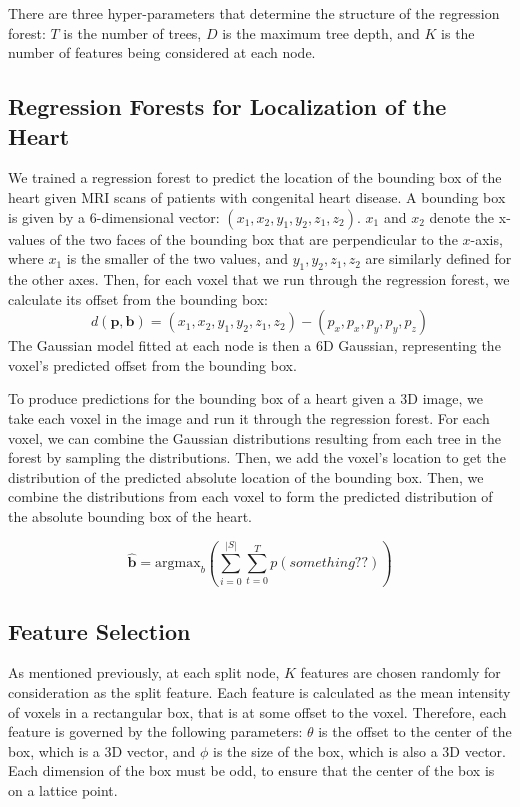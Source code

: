 There are three hyper-parameters that determine the structure of the regression forest: $T$ is the number of trees, $D$ is the maximum tree depth, and $K$ is the number of features being considered at each node.

\subsection{Regression Forests for Localization of the Heart}
We trained a regression forest to predict the location of the bounding box of the heart given MRI scans of patients with congenital heart disease. A bounding box is given by a 6-dimensional vector: $(x_1, x_2, y_1, y_2, z_1, z_2)$. $x_1$ and $x_2$ denote the x-values of the two faces of the bounding box that are perpendicular to the $x$-axis, where $x_1$ is the smaller of the two values, and $y_1, y_2, z_1, z_2$ are similarly defined for the other axes. Then, for each voxel that we run through the regression forest, we calculate its offset from the bounding box:
\begin{equation}
  d(\mathbf{p}, \mathbf{b}) = (x_1, x_2, y_1, y_2, z_1, z_2) - (p_x, p_x, p_y, p_y, p_z)
\end{equation}
The Gaussian model fitted at each node is then a 6D Gaussian, representing the voxel's predicted offset from the bounding box. 

To produce predictions for the bounding box of a heart given a 3D image, we take each voxel in the image and run it through the regression forest. For each voxel, we can combine the Gaussian distributions resulting from each tree in the forest by sampling the distributions. Then, we add the voxel's location to get the distribution of the predicted absolute location of the bounding box. Then, we combine the distributions from each voxel to form the predicted distribution of the absolute bounding box of the heart.

\begin{equation}
  \hat{\mathbf{b}} = \text{argmax}_{b} (\sum_{i = 0} ^ {|S|} \sum_{t=0}^{T} p(something??))
\end{equation}


\subsection{Feature Selection}
As mentioned previously, at each split node, $K$ features are chosen randomly for consideration as the split feature. Each feature is calculated as the mean intensity of voxels in a rectangular box, that is at some offset to the voxel. Therefore, each feature is governed by the following parameters: $\theta$ is the offset to the center of the box, which is a 3D vector, and $\phi$ is the size of the box, which is also a 3D vector. Each dimension of the box must be odd, to ensure that the center of the box is on a lattice point.

